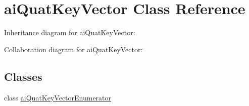 \hypertarget{classai_quat_key_vector}{\section{ai\+Quat\+Key\+Vector Class Reference}
\label{classai_quat_key_vector}
}


Inheritance diagram for ai\+Quat\+Key\+Vector\+:


Collaboration diagram for ai\+Quat\+Key\+Vector\+:
\subsection*{Classes}
\begin{DoxyCompactItemize}
\item 
class \hyperlink{classai_quat_key_vector_1_1ai_quat_key_vector_enumerator}{ai\+Quat\+Key\+Vector\+Enumerator}
\end{DoxyCompactItemize}
